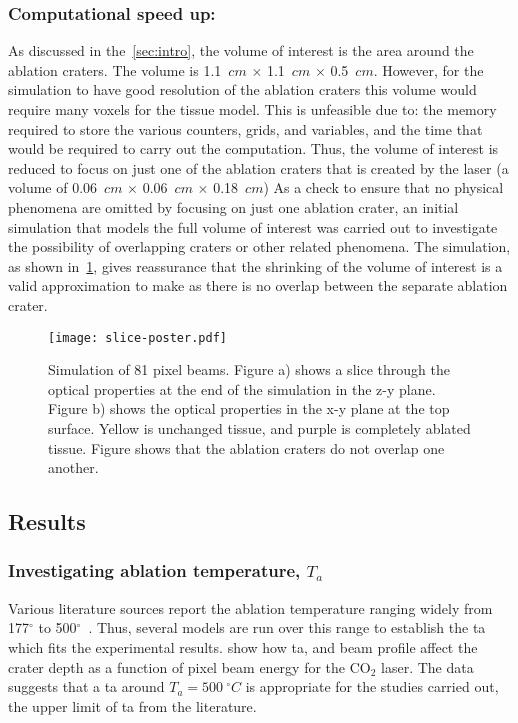 \subsubsection*{Computational speed up:}
As discussed in the~\cref{sec:intro}, the volume of interest is the area around the ablation craters. The volume is 1.1~$cm$ $\times$ 1.1~$cm$ $\times$ 0.5~$cm$. However, for the simulation to have good resolution of the ablation craters this volume would require many voxels for the tissue model. This is unfeasible due to: the memory required to store the various counters, grids, and variables, and the time that would be required to carry out the computation. Thus, the volume of interest is reduced to focus on just one of the ablation craters that is created by the laser (a volume of  0.06~$cm$ $\times$ 0.06~$cm$ $\times$ 0.18~$cm$) 
As a check to ensure that no physical phenomena are omitted by focusing on just one ablation crater, an initial simulation that models the full volume of interest was carried out to investigate the possibility of overlapping craters or other related phenomena. The simulation, as shown in~\cref{fig:sizecheck}, gives reassurance that the shrinking of the volume of interest is a valid approximation to make as there is no overlap between the separate ablation crater.
\begin{figure}[!htbp]
	\centering
    \texttt{[image: slice-poster.pdf]}
    \caption{Simulation of 81 pixel beams. Figure a) shows a slice through the optical properties at the end of the simulation in the z-y plane. Figure b) shows the optical properties in the x-y plane at the top surface. Yellow is unchanged tissue, and purple is completely ablated tissue. Figure shows that the ablation craters do not overlap one another.}
    \label{fig:sizecheck}
\end{figure}


\subsection{Results}

\subsubsection*{Investigating ablation temperature, \texorpdfstring{$T_a$}{Ta}}

Various literature sources report the ablation temperature ranging widely from 177$^{\circ}$ to 500$^{\circ}$~\cite{gerstmann1994char,mckenzie1986three,sagi1992heating}. Thus, several models are run over this range to establish the \gls*{ta} which fits the experimental results.  show how \gls*{ta}, and beam profile affect the crater depth as a function of pixel beam energy for the CO$_2$ laser. The data suggests that a \gls*{ta} around $T_a=500~^{\circ}C$ is appropriate for the studies carried out, the upper limit of \gls*{ta} from the literature.

